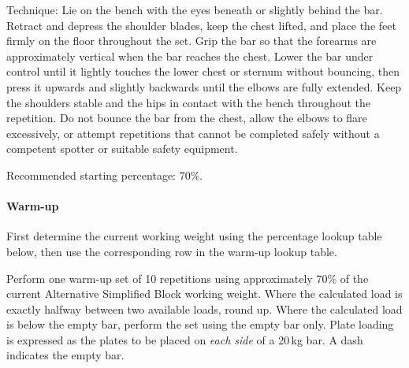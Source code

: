\documentclass[11pt,a4paper]{article}
\begin{document}
Technique: Lie on the bench with the eyes beneath or slightly behind the bar. Retract and depress the shoulder blades, keep the chest lifted, and place the feet firmly on the floor throughout the set. Grip the bar so that the forearms are approximately vertical when the bar reaches the chest. Lower the bar under control until it lightly touches the lower chest or sternum without bouncing, then press it upwards and slightly backwards until the elbows are fully extended. Keep the shoulders stable and the hips in contact with the bench throughout the repetition. Do not bounce the bar from the chest, allow the elbows to flare excessively, or attempt repetitions that cannot be completed safely without a competent spotter or suitable safety equipment.

Recommended starting percentage: 70\%.

\paragraph{Warm-up}

First determine the current working weight using the percentage lookup table below, then use the corresponding row in the warm-up lookup table.

Perform one warm-up set of 10 repetitions using approximately 70\% of the current Alternative Simplified Block working weight. Where the calculated load is exactly halfway between two available loads, round up. Where the calculated load is below the empty bar, perform the set using the empty bar only. Plate loading is expressed as the plates to be placed on \emph{each side} of a 20\,kg bar. A dash indicates the empty bar.
\end{document}
